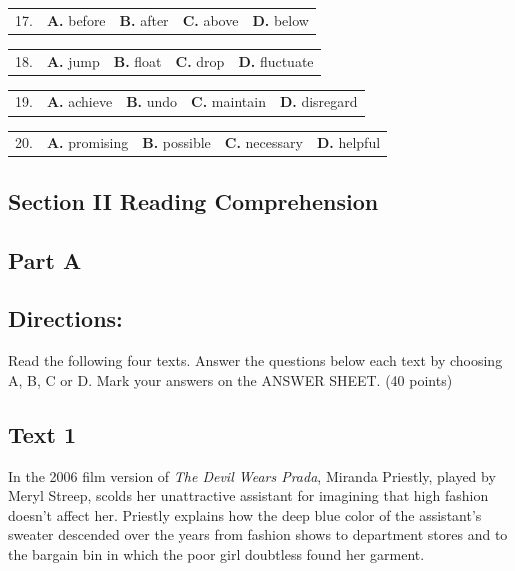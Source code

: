 \documentclass[UTF8,11pt]{ctexart}
\begin{document}
\noindent\begin{tabularx}{\linewidth}{@{}lXXXX@{}}17. & \textbf{A.} before & \textbf{B.} after & \textbf{C.} above & \textbf{D.} below\\\end{tabularx}\par

\noindent\begin{tabularx}{\linewidth}{@{}lXXXX@{}}18. & \textbf{A.} jump & \textbf{B.} float & \textbf{C.} drop & \textbf{D.} fluctuate\\\end{tabularx}\par

\noindent\begin{tabularx}{\linewidth}{@{}lXXXX@{}}19. & \textbf{A.} achieve & \textbf{B.} undo & \textbf{C.} maintain & \textbf{D.} disregard\\\end{tabularx}\par

\noindent\begin{tabularx}{\linewidth}{@{}lXXXX@{}}20. & \textbf{A.} promising & \textbf{B.} possible & \textbf{C.} necessary & \textbf{D.} helpful\\\end{tabularx}\par

\subsection*{\textbf{Section II Reading Comprehension}}


\subsection*{\textbf{Part A}}


\subsection*{\textbf{Directions:}}


Read the following four texts. Answer the questions below each text by choosing A, B, C or D. Mark your answers on the ANSWER SHEET. (40 points)


\subsection*{\textbf{Text 1}}


In the 2006 film version of \textit{The Devil Wears Prada}, Miranda Priestly, played by Meryl Streep, scolds her unattractive assistant for imagining that high fashion doesn’t affect her. Priestly explains how the deep blue color of the assistant’s sweater descended over the years from fashion shows to department stores and to the bargain bin in which the poor girl doubtless found her garment.
\end{document}
